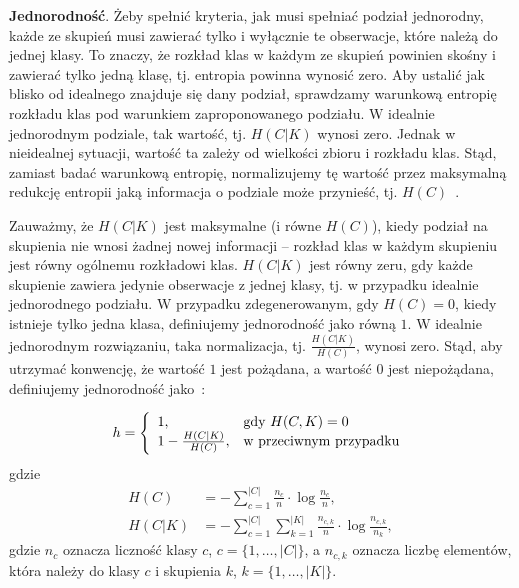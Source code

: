 \documentclass{praca1}
\begin{document}
\textbf{Jednorodność}. Żeby spełnić kryteria, jak musi spełniać podział jednorodny, każde ze skupień musi zawierać tylko i wyłącznie te obserwacje, które należą do jednej klasy. To znaczy, że rozkład klas w każdym ze skupień powinien skośny i zawierać tylko jedną klasę, tj. entropia powinna wynosić zero. Aby ustalić jak blisko od idealnego znajduje się dany podział, sprawdzamy warunkową entropię rozkładu klas pod warunkiem zaproponowanego podziału. W idealnie jednorodnym podziale, tak wartość, tj. $H(C|K)$ wynosi zero. Jednak w nieidealnej sytuacji, wartość ta zależy od wielkości zbioru i rozkładu klas. Stąd, zamiast badać warunkową entropię, normalizujemy tę wartość przez maksymalną redukcję entropii jaką informacja o podziale może przynieść, tj. $H(C)$~\cite{Rosenberg2007:vmeasure}.

Zauważmy, że $H(C|K)$ jest maksymalne (i równe $H(C)$), kiedy podział na skupienia nie wnosi żadnej nowej informacji -- rozkład klas w każdym skupieniu jest równy ogólnemu rozkładowi klas. $H(C|K)$ jest równy zeru, gdy każde skupienie zawiera jedynie obserwacje z jednej klasy, tj. w przypadku idealnie jednorodnego podziału. W przypadku zdegenerowanym, gdy $H(C) = 0$, kiedy istnieje tylko jedna klasa, definiujemy jednorodność jako równą $1$. W idealnie jednorodnym rozwiązaniu, taka normalizacja, tj. $\frac{H(C|K)}{H(C)}$, wynosi zero. Stąd, aby utrzymać konwencję, że wartość $1$ jest pożądana, a wartość $0$ jest niepożądana, definiujemy jednorodność jako~\cite{Rosenberg2007:vmeasure}:

\begin{equation}
h = \left\{
\begin{array}{l l}     
1, & \text{gdy } H(C,K) = 0\\
1 - \frac{H(C|K)}{H(C)}, & \text{w przeciwnym przypadku}
\end{array}\right.
\end{equation}
gdzie
\begin{align*}
H(C) & = - \sum\limits_{c = 1}^{|C|}\frac{n_c}{n}\cdot \log{\frac{n_c}{n}},  \\
H(C|K) & = - \sum\limits_{c = 1}^{|C|}\sum\limits_{k = 1}^{|K|}\frac{n_{c,k}}{n}\cdot \log{\frac{n_{c,k}}{n_k}},
\end{align*}
gdzie $n_c$ oznacza liczność klasy $c$, $c = \{1,\ldots, |C|\}$, a $n_{c,k}$ oznacza liczbę elementów, która należy do klasy $c$ i skupienia $k$, $k = \{1,\ldots, |K|\}$.
\end{document}
